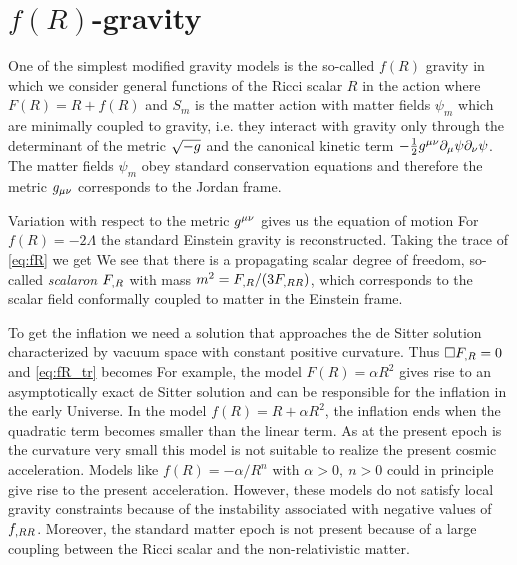 \section{$f(R)$-gravity}
One of the simplest modified gravity models is the so-called $f(R)$ gravity in which we consider general functions of the Ricci scalar $R$ in the action
where $F(R)=R+f(R)$ and $S_m$ is the matter action with matter fields $\psi_m$ which are minimally coupled to gravity, i.e. they interact with gravity only through the determinant of the metric $\sqrt{-g}$ and the canonical kinetic term $-\frac12g^{\mu\nu}\partial_\mu\psi\partial_\nu\psi$. The matter fields $\psi_m$ obey standard conservation equations and therefore the metric $g_{\mu\nu}$ corresponds to the Jordan frame.

Variation with respect to the metric $g^{\mu\nu}$ gives us the equation of motion
For $f(R)=-2\Lambda$ the standard Einstein gravity is reconstructed. Taking the trace of \eqref{eq:fR} we get
We see that there is a propagating scalar degree of freedom, so-called \textit{scalaron} $F_{,R}$ with mass $m^2=F_{,R}/(3F_{,RR})$, which corresponds to the scalar field conformally coupled to matter in the Einstein frame.

To get the inflation we need a solution that approaches the de Sitter solution characterized by vacuum space with constant positive curvature. Thus $\Box F_{,R}=0$ and \eqref{eq:fR_tr} becomes
For example, the model $F(R)=\alpha R^2$ gives rise to an asymptotically exact de Sitter solution and can be responsible for the inflation in the early Universe. In the model $f(R) = R + \alpha R^2$, the inflation ends when the quadratic term becomes smaller than the linear term. As at the present epoch is the curvature very small this model is not suitable to realize the present cosmic acceleration. Models like $f(R)=-\alpha/R^n$ with $\alpha>0,\ n>0$ could in principle give rise to the present acceleration. However, these models do not satisfy local gravity constraints because of the instability associated with negative values of $f_{,RR}$. Moreover, the standard matter epoch is not present because of a large coupling between the Ricci scalar and the non-relativistic matter.

